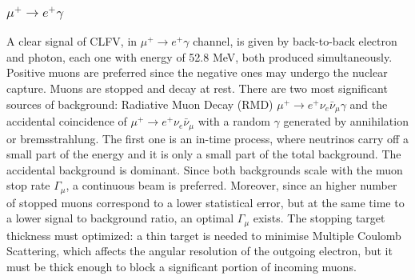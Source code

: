 \subsubsection{$\mu^+ \rightarrow e^+ \gamma$}
A clear signal of CLFV, in $\mu^+ \rightarrow e^+ \gamma$ channel, is given by back-to-back electron and photon, each one with energy of 52.8 MeV, 
both produced simultaneously. Positive muons are preferred since the negative ones may undergo the nuclear capture. 
Muons are stopped and decay at rest. There are two most significant sources of background: Radiative Muon Decay (RMD) $\mu^+ \rightarrow e^+ \nu_e \bar{\nu}_\mu \gamma$ 
and the accidental coincidence of $\mu^+ \rightarrow e^+ \nu_e \bar{\nu}_\mu$ with a random $\gamma$ 
generated by annihilation or bremsstrahlung. The first one is an in-time process, where neutrinos carry off a small part of the energy 
and it is only a small part of the total background. The accidental background is dominant. Since both backgrounds scale with the muon stop rate $\Gamma_\mu$, a continuous beam is preferred. 
Moreover, since an higher number of stopped muons correspond to a lower statistical error, but at the same time to a lower signal to background ratio, an optimal $\Gamma_\mu$ exists.
The stopping target thickness must optimized: a thin target is needed to minimise Multiple Coulomb Scattering, which affects the angular resolution of the outgoing electron, but 
it must be thick enough to block a significant portion of incoming muons. 
